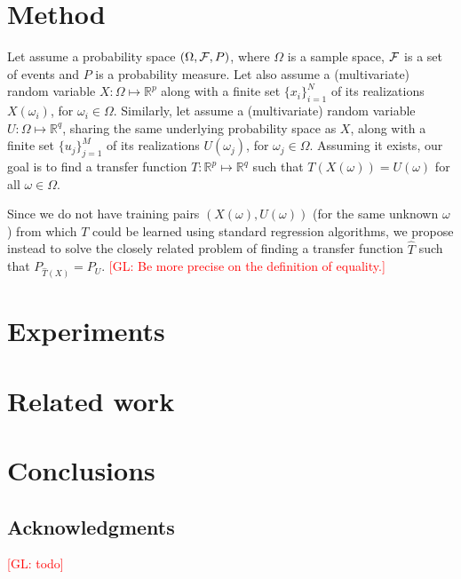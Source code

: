 \documentclass{article}
\newcommand{\glnote}[1]{\textcolor{red}{[GL: #1]}}
\begin{document}



\section{Method}

Let assume a probability space $(\Omega, {\cal F}, P)$, where $\Omega$ is a
sample space, ${\cal F}$ is a set of events and $P$ is a probability measure.
Let also assume a (multivariate) random variable $X: \Omega \mapsto
\mathbb{R}^p$ along with a finite set $\{x_i\}_{i=1}^N$ of its realizations
$X(\omega_i)$, for $\omega_i \in \Omega$. Similarly, let assume a (multivariate)
random variable $U: \Omega \mapsto \mathbb{R}^q$, sharing the same underlying
probability space as $X$, along with a finite set $\{u_j\}_{j=1}^M$ of its realizations
$U(\omega_j)$, for $\omega_j \in \Omega$.  Assuming it exists, our goal is to find a
transfer function $T: \mathbb{R}^p \mapsto \mathbb{R}^q$ such that
$T(X(\omega)) = U(\omega)$ for all $\omega \in \Omega$.

Since we do not have training pairs $(X(\omega), U(\omega))$ (for the same
unknown $\omega$) from which $T$ could be learned using standard regression
algorithms, we propose instead to solve the closely related problem of
finding a transfer function $\hat T$ such that $P_{\hat{T}(X)} = P_U$. \glnote{Be more precise on the definition of equality.}





\section{Experiments}


\section{Related work}


\section{Conclusions}


\subsection*{Acknowledgments}

\glnote{todo}



\end{document}
